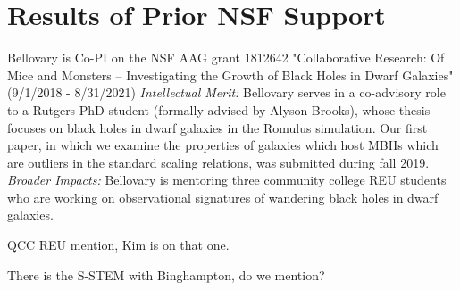 \documentclass[12pt]{article}
\begin{document}
\section{Results of Prior NSF Support}
\vspace{-3mm}
Bellovary is Co-PI on the NSF AAG grant 1812642 "Collaborative Research: Of Mice and Monsters -- Investigating the Growth of Black Holes in Dwarf Galaxies" (9/1/2018 - 8/31/2021)  {\em Intellectual Merit:}  Bellovary serves in a co-advisory role to a Rutgers PhD student (formally advised by Alyson Brooks), whose thesis focuses on black holes in dwarf galaxies in the Romulus simulation.  Our first paper, in which we examine the properties of galaxies which host MBHs which are outliers in the standard scaling relations, was submitted during fall 2019.  {\em Broader Impacts:}  Bellovary is mentoring three community college REU students who are working on observational signatures of wandering black holes in dwarf galaxies.

QCC REU mention, Kim is on that one.

There is the S-STEM with Binghampton, do we mention?

\newpage

\end{document}
